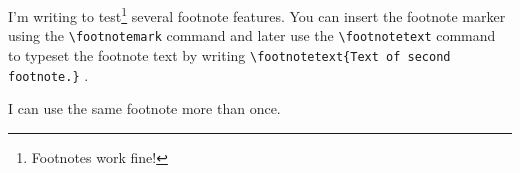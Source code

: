 \documentclass{article}
\begin{document}
	I'm writing to test\footnote{Footnotes work fine!} several footnote features. 
	You can insert the footnote marker\footnotemark{} using the \verb|\footnotemark|
	command and later use the \verb|\footnotetext| command to typeset the footnote
	text by writing \verb||
	\footnotetext{Text of second footnote.}.
	
	I can use the same footnote\footnotemark{} more than 
	once\footnotemark[\value{footnote}].
	
\end{document}
